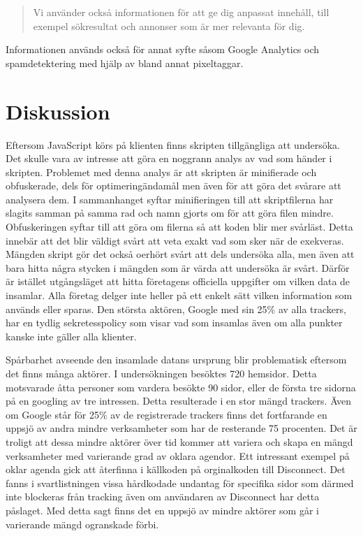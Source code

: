\documentclass[a4paper,11pt]{article}
\begin{document}
{\begin{quote}
Vi använder också informationen för att ge dig anpassat innehåll, till exempel sökresultat och annonser som är mer relevanta för dig.
\end{quote}

Informationen används också för annat syfte såsom Google Analytics och spamdetektering med hjälp av bland annat pixeltaggar.

\section{Diskussion}
Eftersom JavaScript körs på klienten finns skripten tillgängliga att undersöka. Det skulle vara av intresse att göra en noggrann analys av vad som händer i skripten. Problemet med denna analys är att skripten är minifierade och obfuskerade, dels för optimeringändamål men även för att göra det svårare att analysera dem. I sammanhanget syftar minifieringen till att skriptfilerna har slagits samman på samma rad och namn gjorts om för att göra filen mindre. Obfuskeringen syftar till att göra om filerna så att koden blir mer svårläst. Detta innebär att det blir väldigt svårt att veta exakt vad som sker när de exekveras. Mängden skript gör det också oerhört svårt att dels undersöka alla, men även att bara hitta  några stycken i mängden som är värda att undersöka är svårt. Därför är istället utgångsläget att hitta företagens officiella uppgifter om vilken data de insamlar. Alla företag delger inte heller på ett enkelt sätt vilken information som används eller sparas. Den största aktören, Google med sin 25\% av alla trackers, har en tydlig sekretesspolicy som visar vad som insamlas även om alla punkter kanske inte gäller alla klienter.

Spårbarhet avseende den insamlade datans ursprung blir problematisk eftersom det finns många aktörer. I undersökningen besöktes 720 hemsidor. Detta motsvarade åtta personer som vardera besökte 90 sidor, eller de första tre sidorna på en googling av tre intressen. Detta resulterade i en stor mängd trackers. Även om Google står för 25\% av de registrerade trackers finns det fortfarande en uppsjö av andra mindre verksamheter som har de resterande 75 procenten. Det är troligt att dessa mindre aktörer över tid kommer att variera och skapa en mängd verksamheter med varierande grad av oklara agendor. Ett intressant exempel på oklar agenda gick att återfinna i källkoden på orginalkoden till Disconnect. Det fanns i svartlistningen vissa hårdkodade undantag för specifika sidor som därmed inte blockeras från tracking även om användaren av Disconnect har detta påslaget. Med detta sagt finns det en uppsjö av mindre aktörer som går i varierande mängd ogranskade förbi. 

}
\end{document}
